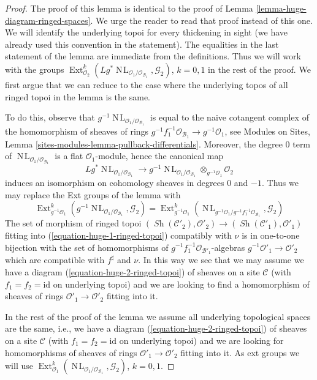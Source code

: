 \documentclass[10pt,a4paper]{amsart}
\theoremstyle{plain}
\theoremstyle{definition}
\theoremstyle{remark}
\numberwithin{equation}{subsection}
\def\Ext{\mathop{\mathrm{Ext}}\nolimits}
\def\Sh{\mathop{\mathit{Sh}}\nolimits}
\def\NL{\mathop{N\!L}\nolimits}
\begin{document}
\begin{proof}
The proof of this lemma is identical to the proof of
Lemma \ref{lemma-huge-diagram-ringed-spaces}.
We urge the reader to read that proof instead of this one.
We will identify the underlying topoi for every
thickening in sight (we have already used this convention
in the statement). The equalities in the last statement of the
lemma are immediate from the definitions. Thus we will work with the groups
$\Ext^k_{\mathcal{O}_2}(
Lg^*\NL_{\mathcal{O}_1/\mathcal{O}_{\mathcal{B}_1}}, \mathcal{G}_2)$,
$k = 0, 1$ in the rest of the proof. We first argue that we can reduce
to the case where the underlying topos of all ringed topoi in the lemma
is the same.

\medskip\noindent
To do this, observe that
$g^{-1}\NL_{\mathcal{O}_1/\mathcal{O}_{\mathcal{B}_1}}$ is equal to the naive
cotangent complex of the homomorphism of sheaves of rings
$g^{-1}f_1^{-1}\mathcal{O}_{\mathcal{B}_1} \to g^{-1}\mathcal{O}_1$, see
Modules on Sites, Lemma \ref{sites-modules-lemma-pullback-differentials}.
Moreover, the degree $0$ term of
$\NL_{\mathcal{O}_1/\mathcal{O}_{\mathcal{B}_1}}$ is a flat
$\mathcal{O}_1$-module, hence the canonical map
$$
Lg^*\NL_{\mathcal{O}_1/\mathcal{O}_{\mathcal{B}_1}}
\longrightarrow
g^{-1}\NL_{\mathcal{O}_1/\mathcal{O}_{\mathcal{B}_1}}
\otimes_{g^{-1}\mathcal{O}_1} \mathcal{O}_2
$$
induces an isomorphism on cohomology sheaves in degrees $0$ and $-1$.
Thus we may replace the Ext groups of the lemma with
$$
\Ext^k_{g^{-1}\mathcal{O}_1}(
g^{-1}\NL_{\mathcal{O}_1/\mathcal{O}_{\mathcal{B}_1}}, \mathcal{G}_2) =
\Ext^k_{g^{-1}\mathcal{O}_1}(
\NL_{g^{-1}\mathcal{O}_1/g^{-1}f_1^{-1}\mathcal{O}_{\mathcal{B}_1}},
\mathcal{G}_2)
$$
The set of morphism of ringed topoi
$(\Sh(\mathcal{C}'_2), \mathcal{O}'_2) \to
(\Sh(\mathcal{C}'_1), \mathcal{O}'_1)$ fitting into
(\ref{equation-huge-1-ringed-topoi}) compatibly with $\nu$ is in
one-to-one bijection with the set of homomorphisms of
$g^{-1}f_1^{-1}\mathcal{O}_{\mathcal{B}'_1}$-algebras
$g^{-1}\mathcal{O}'_1 \to \mathcal{O}'_2$ which are compatible with
$f^\sharp$ and $\nu$. In this way we see that we may assume we have a
diagram (\ref{equation-huge-2-ringed-topoi}) of sheaves on a site
$\mathcal{C}$ (with $f_1 = f_2 = \text{id}$ on underlying topoi)
and we are looking to find a homomorphism of sheaves of rings
$\mathcal{O}'_1 \to \mathcal{O}'_2$ fitting into it.

\medskip\noindent
In the rest of the proof of the lemma we assume
all underlying topological spaces are the
same, i.e., we have a diagram (\ref{equation-huge-2-ringed-topoi})
of sheaves on a site $\mathcal{C}$ (with $f_1 = f_2 = \text{id}$
on underlying topoi) and we are looking for
homomorphisms of sheaves of rings
$\mathcal{O}'_1 \to \mathcal{O}'_2$ fitting into it.
As ext groups we will use
$\Ext^k_{\mathcal{O}_1}(
\NL_{\mathcal{O}_1/\mathcal{O}_{\mathcal{B}_1}}, \mathcal{G}_2)$, $k = 0, 1$.


\end{proof}
\end{document}

